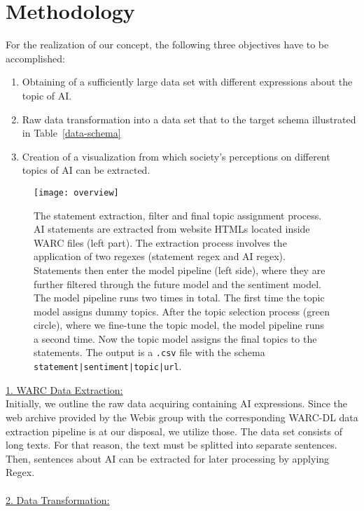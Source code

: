 \section{Methodology}

For the realization of our concept, the following three objectives have to be accomplished:

\begin{enumerate}
    \item Obtaining of a sufficiently large data set with different expressions about the topic of AI.
    \item Raw data transformation into a data set that to the target schema illustrated in Table~\ref{data-schema}
    \item Creation of a visualization from which society's perceptions on different topics of AI can be extracted.
\end{enumerate}%
%
%
\begin{figure}[t]
    \centering
    \texttt{[image: overview]}
    \caption{
        The statement extraction, filter and final topic assignment process.
        AI statements are extracted from website HTMLs located inside WARC files (left part).
        The extraction process involves the application of two regexes (statement regex and AI regex).
        Statements then enter the model pipeline (left side), where they are further filtered through the future model and the sentiment model.
        The model pipeline runs two times in total. The first time the topic model assigns dummy topics.
        After the topic selection process (green circle), where we fine-tune the topic model, the model pipeline runs a second time.
        Now the topic model assigns the final topics to the statements.
        The output is a \texttt{.csv} file with the schema \texttt{statement|sentiment|topic|url}.
    }
    \label{fig:overview}
\end{figure}
\underline{1. WARC Data Extraction:}
\\
Initially, we outline the raw data acquiring containing AI expressions.
Since the web archive provided by the Webis group with the corresponding WARC-DL data extraction pipeline \citep{Deckers2022} is at our disposal, we utilize those.
The data set consists of long texts.
For that reason, the text must be splitted into separate sentences.
Then, sentences about AI can be extracted for later processing by applying Regex.
\\
\\
%
\underline{2. Data Transformation:}
